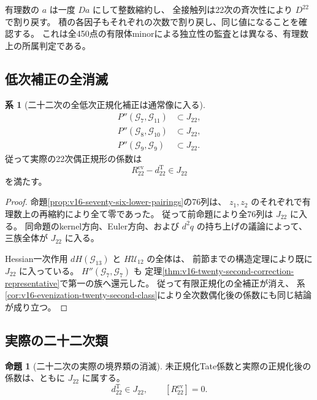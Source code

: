 \documentclass[a4paper,11pt]{ltjsarticle}
\theoremstyle{definition}
\newtheorem{proposition}[theorem]{命題}
\newtheorem{corollary}[theorem]{系}
\begin{document}
有理数の $a$ は一度 $Da$ にして整数縮約し、
全接触列は22次の斉次性により $D^{22}$ で割り戻す。
積の各因子もそれぞれの次数で割り戻し、同じ値になることを確認する。
これは全450点の有限体minorによる独立性の監査とは異なる、有理数上の所属判定である。

\subsection{低次補正の全消滅}

\begin{corollary}[二十二次の全低次正規化補正は通常像に入る]
\label{cor:v16-all-lower-corrections-in-image}
\[
 \begin{split}
 P''(\mathcal G_7,\mathcal G_{11})&\subset J_{22},\\
 P''(\mathcal G_8,\mathcal G_{10})&\subset J_{22},\\
 P''(\mathcal G_9,\mathcal G_9)&\subset J_{22}.
 \end{split}
\]
従って実際の22次偶正規形の係数は
\begin{equation}\label{eq:v16-all-corrections-vanish}
 R_{22}^{\mathrm{ev}}-d_{22}^{\mathrm T}\in J_{22}
\end{equation}
を満たす。
\end{corollary}

\begin{proof}
命題\ref{prop:v16-seventy-six-lower-pairings}の76列は、
$z_1,z_2$ のそれぞれで有理数上の再縮約により全て零であった。
従って前命題により全76列は $J_{22}$ に入る。
同命題のkernel方向、Euler方向、および $d^2q$ の持ち上げの議論によって、
三族全体が $J_{22}$ に入る。

Hessian一次作用 $dH(\mathcal G_{13})$ と $H\mathcal U_{12}$ の全体は、
前節までの構造定理により既に $J_{22}$ に入っている。
$H''(\mathcal G_7,\mathcal G_7)$ も
定理\ref{thm:v16-twenty-second-correction-representative}で第一の族へ還元した。
従って有限正規化の全補正が消え、
系\ref{cor:v16-evenization-twenty-second-class}により全次数偶化後の係数にも同じ結論が成り立つ。
\end{proof}

\subsection{実際の二十二次類}

\begin{proposition}[二十二次の実際の境界類の消滅]
\label{prop:v16-actual-twenty-second-class}
未正規化Tate係数と実際の正規化後の係数は、ともに $J_{22}$ に属する。
\[
                d_{22}^{\mathrm T}\in J_{22},\qquad
                [R_{22}^{\mathrm{ev}}]=0.
\]
\end{proposition}
\end{document}
